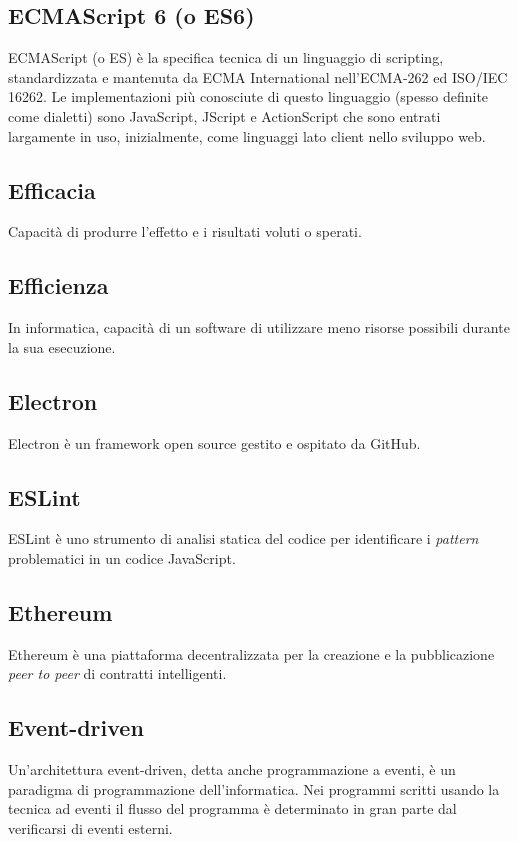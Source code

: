 
\subsection*{ECMAScript 6 (o ES6)}
ECMAScript (o ES) è la specifica tecnica di un linguaggio di scripting, standardizzata e mantenuta da ECMA International nell'ECMA-262 ed ISO/IEC 16262.
Le implementazioni più conosciute di questo linguaggio (spesso definite come dialetti) sono JavaScript, JScript e ActionScript che sono entrati largamente in uso, inizialmente, come linguaggi lato client nello sviluppo web.

\subsection*{Efficacia}
Capacità di produrre l'effetto e i risultati voluti o sperati.

\subsection*{Efficienza}
In informatica, capacità di un software di utilizzare meno risorse possibili durante la sua esecuzione.

\subsection*{Electron}
Electron è un framework open source gestito e ospitato da GitHub.

\subsection*{ESLint}
ESLint è uno strumento di analisi statica del codice per identificare i \textit{pattern} problematici in un codice JavaScript.

\subsection*{Ethereum}
Ethereum è una piattaforma decentralizzata per la creazione e la pubblicazione \textit{peer to peer} di contratti intelligenti.

\subsection*{Event-driven}
Un'architettura event-driven, detta anche programmazione a eventi, è un paradigma di programmazione dell'informatica. Nei programmi scritti usando la tecnica ad eventi il flusso del programma è determinato in gran parte dal verificarsi di eventi esterni.


